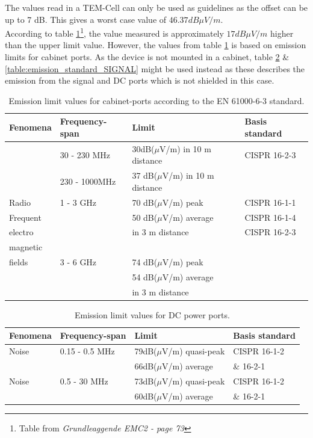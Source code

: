 The values read in a TEM-Cell can only be used as guidelines as the offset can be up to 7 dB. This gives a worst case value of $ 46.37 dB\mu V/m$.
\\\p According to table \ref{table:emission_standard_CABINET}\footnote{Table from \textit{Grundleaggende EMC2 - page 73}}, the value measured is approximately $17dB\mu V/m$ higher than the upper limit value.
However, the values from table \ref{table:emission_standard_CABINET} is based on emission limits for cabinet ports. As the device is not mounted in a cabinet, table \ref{table:emission_standard_DC} \& \ref{table:emission_standard_SIGNAL} might be used instead as these describes the emission from the signal and DC ports which is not shielded in this case.
\begin{table}[H]
		\begin{center}
		\begin{tabular}{|l|l|l|l|}\hline
			Fenomena 	& Frequency-span & Limit & Basis standard\\\hline
			~ 			& 30 - 230 MHz		& 30dB($\mu$V/m) in 10 m distance		& CISPR 16-2-3	\\
			~			& 230 - 1000MHz 	& 37 dB($\mu$V/m) in 10 m distance 	& ~				\\\hline
			Radio		& 1 - 3 GHz		& 70 dB($\mu$V/m) peak				& CISPR 16-1-1	\\
			Frequent		&				& 50 dB($\mu$V/m) average			& CISPR 16-1-4	\\
			electro		&				& in 3 m distance					& CISPR 16-2-3	\\
			magnetic		&				& 								& 				\\
			fields		& 3 - 6 GHz		& 74 dB($\mu$V/m) peak				& 				\\
			~			&				& 54 dB($\mu$V/m) average			& 				\\
			~			&				& in 3 m distance					& 				\\\hline
		\end{tabular}
		\end{center}
	\caption{Emission limit  values for cabinet-ports according to the EN 61000-6-3 standard.}
	\label{table:emission_standard_CABINET}
\end{table}

\begin{table}[H]
		\begin{center}
		\begin{tabular}{|l|l|l|l|}\hline
			Fenomena 	& Frequency-span & Limit & Basis standard\\\hline
			Noise		& 0.15 - 0.5 MHz		& 79dB($\mu$V/m) quasi-peak		& CISPR 16-1-2	\\
			~			& ~					& 66dB($\mu$V/m) average		& \& 16-2-1		\\\hline
			Noise		& 0.5 - 30 MHz			& 73dB($\mu$V/m) quasi-peak		& CISPR 16-1-2	\\
			~			& ~					& 60dB($\mu$V/m) average		& \& 16-2-1		\\\hline
		\end{tabular}
		\end{center}
	\caption{Emission limit  values for DC power ports.}
	\label{table:emission_standard_DC}
\end{table}

